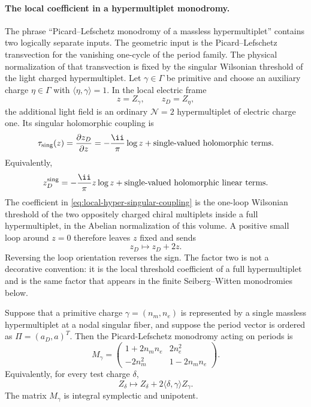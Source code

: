 \paragraph{The local coefficient in a hypermultiplet monodromy.}
The phrase ``Picard--Lefschetz monodromy of a massless hypermultiplet''
contains two logically separate inputs.  The geometric input is the
Picard--Lefschetz transvection for the vanishing one-cycle of the period
family.  The physical normalization of that transvection is fixed by the
singular Wilsonian threshold of the light charged hypermultiplet.  Let
\(\gamma\in\Gamma\) be primitive and choose an auxiliary charge
\(\eta\in\Gamma\) with \(\langle\eta,\gamma\rangle=1\).  In the local
electric frame
\[
  z=Z_\gamma,\qquad z_D=Z_\eta ,
\]
the additional light field is an ordinary \(\mathcal N=2\) hypermultiplet of
electric charge one.  Its singular holomorphic coupling is
\begin{equation}
  \tau_{\rm sing}(z)
  =
  \frac{\partial z_D}{\partial z}
  =
  -\frac{\ii}{\pi}\log z
  + \hbox{single-valued holomorphic terms}.
  \label{eq:local-hyper-singular-coupling}
\end{equation}
Equivalently,
\[
  z_D^{\rm sing}
  =
  -\frac{\ii}{\pi}z\log z
  + \hbox{single-valued holomorphic linear terms}.
\]
The coefficient in \eqref{eq:local-hyper-singular-coupling} is the
one-loop Wilsonian threshold of the two oppositely charged chiral multiplets
inside a full hypermultiplet, in the Abelian normalization of this volume.
A positive small loop around \(z=0\) therefore leaves \(z\) fixed and sends
\begin{equation}
  z_D\longmapsto z_D+2z .
  \label{eq:local-hyper-dual-period-shift}
\end{equation}
Reversing the loop orientation reverses the sign.  The factor two is not a
decorative convention: it is the local threshold coefficient of a full
hypermultiplet and is the same factor that appears in the finite
Seiberg--Witten monodromies below.

\begin{lemma}
\label{lem:rank-one-hyper-pl-monodromy}
Suppose that a primitive charge \(\gamma=(n_m,n_e)\) is represented by a
single massless hypermultiplet at a nodal singular fiber, and suppose the
period vector is ordered as \(\Pi=(a_D,a)^T\).  Then the Picard-Lefschetz
monodromy acting on periods is
\begin{equation}
  M_\gamma
  =
  \begin{pmatrix}
  1+2n_m n_e&2n_e^2\\
  -2n_m^2&1-2n_m n_e
  \end{pmatrix}.
  \label{eq:sw-picard-lefschetz-charge-monodromy}
\end{equation}
Equivalently, for every test charge \(\delta\),
\begin{equation}
  Z_\delta\longmapsto
  Z_\delta+2\langle\delta,\gamma\rangle Z_\gamma .
  \label{eq:rank-one-pl-central-charge-action}
\end{equation}
The matrix \(M_\gamma\) is integral symplectic and unipotent.
\end{lemma}

